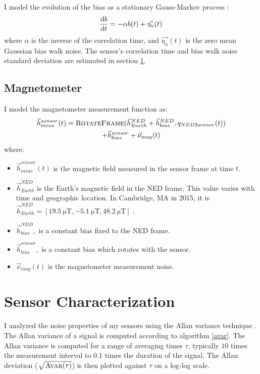 \documentclass[conference]{IEEEtran}
\begin{document}
I model the evolution of the bias as a stationary Gauss-Markov process \cite{1642588, park}:
\begin{equation}
  \dv{b}{t} = - \alpha b(t) + \vec{\eta_u}(t)
\end{equation}
where $\alpha$ is the inverse of the correlation time, and $\vec{\eta_u}(t)$ is the zero mean Gaussian bias walk noise. The sensor's correlation time and bias walk noise standard deviation are estimated in section \ref{sensor_char}.


\subsection{Magnetometer}
I model the magnetometer measurement function as:
\begin{multline}
  \vec{h}_{meas}^{sensor}(t) = \textproc{RotateFrame}(\vec{h}_{Earth}^{NED} + \vec{h}_{bias}^{NED}, q_{NED2sensor}(t)) \\
  + \vec{h}_{bias}^{sensor} + \vec{\nu}_{mag}(t)
\end{multline}
where:
\begin{itemize}
  \item $\vec{h}_{meas}^{sensor}(t)$ is the magnetic field measured in the sensor frame at time $t$.
  \item $\vec{h}_{Earth}^{NED}$ is the Earth's magnetic field in the NED frame. This value varies with time and geographic location. In Cambridge, MA in 2015, it is $\vec{h}_{Earth}^{NED} = [\SI{19.5}{\micro\tesla}, \SI{-5.1}{\micro\tesla}, \SI{48.2}{\micro\tesla}]$ \cite{wmm}.
  \item $\vec{h}_{bias}^{NED},$ is a constant bias fixed to the NED frame.
  \item $\vec{h}_{bias}^{sensor},$ is a constant bias which rotates with the sensor.
  \item $\vec{\nu}_{mag}(t)$ is the magnetometer measurement noise.
\end{itemize}


\section{Sensor Characterization}
\label{sensor_char}
I analyzed the noise properties of my sensors using the Allan variance technique \cite{UCAM-CL-TR-696}. The Allan variance of a signal is computed  according to algorithm \ref{avar}. The Allan variance is computed for a range of averaging times $\tau$, typically $10$ times the measurement interval to $0.1$ times the duration of the signal. The Allan deviation ($\sqrt{\textproc{Avar}(\tau)}$) is then plotted against $\tau$ on a log-log scale.\\
\end{document}
